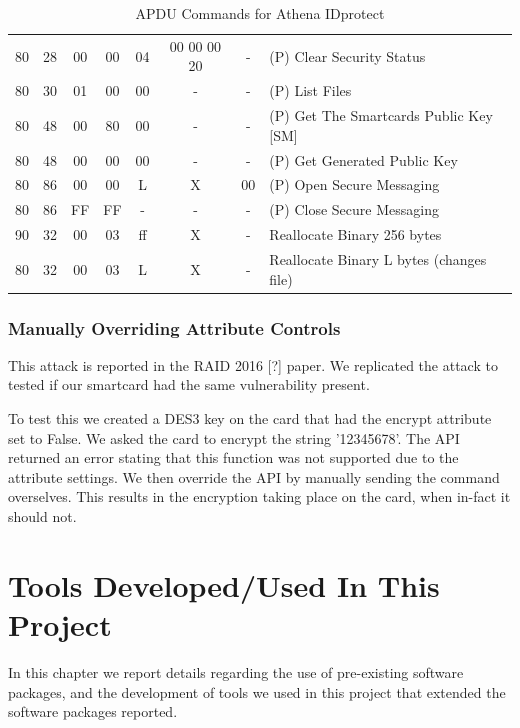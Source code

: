 \documentclass[bsc,frontabs,twoside,singlespacing,parskip,deptreport]{infthesis}     %
\begin{document}
\begin{table}[H]
\begin{tabular}{|c|c|c|c|c|c|c|p{8cm}|}
80  & 28  & 00 & 00 & 04  & 00 00 00 20& -  & (P) Clear Security Status\\
80  & 30  & 01 & 00 & 00  & -          & -  & (P) List Files\\
80  & 48  & 00 & 80 & 00  & -          & -  & (P) Get The Smartcards Public Key [SM]\\
80  & 48  & 00 & 00 & 00  & -          & -  & (P) Get Generated Public Key\\
80  & 86  & 00 & 00 & L   & X          & 00 & (P) Open Secure Messaging\\
80  & 86  & FF & FF & -   & -          & -  & (P) Close Secure Messaging\\
\hline
90  & 32  & 00 & 03 & ff  & X          & -  &  Reallocate Binary 256 bytes\\
80  & 32  & 00 & 03 & L   & X          & -  &  Reallocate Binary L bytes (changes file)\\
\hline
\end{tabular}
\caption{APDU Commands for Athena IDprotect}
\end{table} 


\subsection{Manually Overriding Attribute Controls}
This attack is reported in the RAID 2016 [?] paper. We replicated the attack to tested if our smartcard had the same vulnerability present. 

To test this we created a DES3 key on the card that had the encrypt attribute set to False. We asked the card to encrypt the string '12345678'. The API returned an error stating that this function was not supported due to the attribute settings. We then override the API by manually sending the command overselves. This results in the encryption taking place on the card, when in-fact it should not.



\chapter{Tools Developed/Used In This Project}

In this chapter we report details regarding the use of pre-existing software packages, and the development of tools we used in this project that extended the software packages reported.
\end{document}
